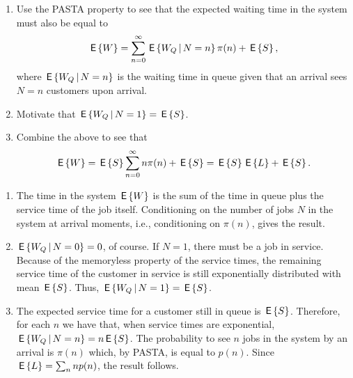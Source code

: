 \begin{question}
  \begin{enumerate}
  \item 
  Use the PASTA property to see that the expected waiting time in the
  system must also be equal to
\begin{equation*}
  \,\mathsf{E}\left\{W\right\} = \sum_{n=0}^\infty \,\mathsf{E}\left\{W_Q \,\middle|\, N=n\right\} \pi(n) + \,\mathsf{E}\left\{S\right\},
\end{equation*}
where $\,\mathsf{E}\left\{W_Q \,\middle|\, N=n\right\}$ is the waiting time in queue given that an
arrival sees $N=n$ customers upon arrival. 
\item Motivate that $\,\mathsf{E}\left\{W_Q \,\middle|\, N=1\right\} = \,\mathsf{E}\left\{S\right\}$. 
\item  Combine the above to see that 
\begin{equation*}
  \,\mathsf{E}\left\{W\right\} = \,\mathsf{E}\left\{S\right\} \sum_{n=0}^\infty n \pi(n) + \,\mathsf{E}\left\{S\right\} = \,\mathsf{E}\left\{S\right\} \,\mathsf{E}\left\{L\right\} + \,\mathsf{E}\left\{S\right\}.
\end{equation*}
  \end{enumerate}
  \begin{solution}
    \begin{enumerate}
    \item The time in the system $\,\mathsf{E}\left\{W\right\}$ is the sum of the time in
      queue plus the service time of the job itself.  Conditioning on
      the number of jobs $N$ in the system at arrival moments, i.e.,
      conditioning on $\pi(n)$, gives the result.  
    \item $\,\mathsf{E}\left\{W_Q\,\middle|\, N=0\right\}=0$, of course. If $N=1$, there must be a job
      in service.  Because of the memoryless property of the service
      times, the remaining service time of the customer in service is
      still exponentially distributed with mean $\,\mathsf{E}\left\{S\right\}$. Thus,
      $\,\mathsf{E}\left\{W_Q\,\middle|\, N=1\right\}=\,\mathsf{E}\left\{S\right\}$. 
    \item The expected service time for a customer still in queue is
      $\,\mathsf{E}\left\{S\right\}$.  Therefore, for each $n$ we have that, when service
      times are exponential, $\,\mathsf{E}\left\{W_Q\,\middle|\, N=n\right\}= n \,\mathsf{E}\left\{S\right\}$. The probability
      to see $n$ jobs in the system by an arrival is $\pi(n)$ which,
      by PASTA, is equal to $p(n)$. Since $\,\mathsf{E}\left\{L\right\} = \sum_n n p(n)$, the
      result follows.
    \end{enumerate}
  \end{solution}
\end{question}

